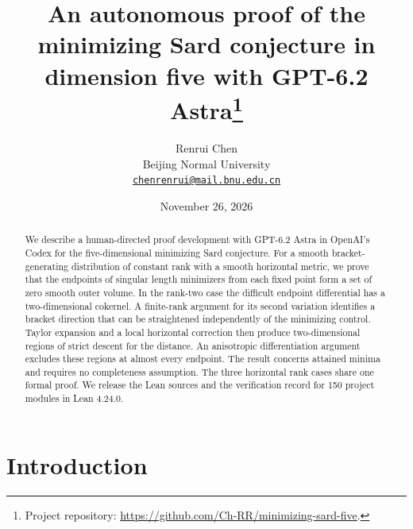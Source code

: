 \documentclass[11pt,letterpaper]{article}
\newcommand{\papertitle}{An autonomous proof of the minimizing Sard conjecture in dimension five with GPT-6.2 Astra}
\begin{document}
\title{\papertitle\thanks{Project repository: \url{https://github.com/Ch-RR/minimizing-sard-five}.}}
\author{Renrui Chen\\
  \normalsize Beijing Normal University\\
  \small\href{mailto:chenrenrui@mail.bnu.edu.cn}{\texttt{chenrenrui@mail.bnu.edu.cn}}}
\date{November 26, 2026}
\begingroup
\renewcommand{\textasteriskcentered}{\ensuremath{\ast}}
\maketitle
\endgroup
\begin{abstract}
We describe a human-directed proof development with GPT-6.2 Astra in OpenAI's
Codex for the five-dimensional minimizing Sard conjecture. For a smooth
bracket-generating distribution of constant rank with a smooth horizontal
metric, we prove that the endpoints of singular length minimizers from each
fixed point form a set of zero smooth outer volume.
In the rank-two case the difficult endpoint differential has a two-dimensional
cokernel. A finite-rank argument for its second variation identifies a bracket
direction that can be straightened independently of the minimizing control.
Taylor expansion and a local horizontal correction then produce two-dimensional
regions of strict descent for the distance. An anisotropic differentiation
argument excludes these regions at almost every endpoint. The result concerns
attained minima and requires no completeness assumption. The three horizontal
rank cases share one formal proof. We release the Lean sources and the
verification record for 150 project modules in Lean 4.24.0.
\end{abstract}
\section{Introduction}
\end{document}
